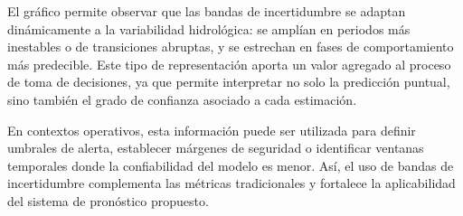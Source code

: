 El gráfico permite observar que las bandas de incertidumbre se adaptan dinámicamente a la variabilidad hidrológica: se amplían en periodos más inestables o de transiciones abruptas, y se estrechan en fases de comportamiento más predecible. Este tipo de representación aporta un valor agregado al proceso de toma de decisiones, ya que permite interpretar no solo la predicción puntual, sino también el grado de confianza asociado a cada estimación.

En contextos operativos, esta información puede ser utilizada para definir umbrales de alerta, establecer márgenes de seguridad o identificar ventanas temporales donde la confiabilidad del modelo es menor. Así, el uso de bandas de incertidumbre complementa las métricas tradicionales y fortalece la aplicabilidad del sistema de pronóstico propuesto.
